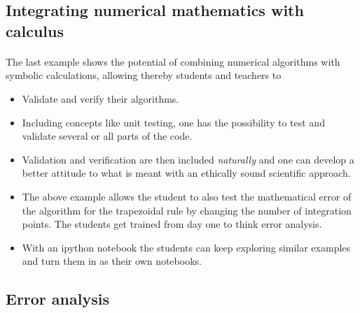 \documentclass[%
twoside,                 %
final,                   %
10pt]{article}
\begin{document}
\subsection{Integrating numerical mathematics with calculus}

\paragraph{}
The last example shows the potential of combining numerical algorithms with symbolic calculations, allowing thereby students and teachers to

\begin{itemize}
\item Validate and verify  their  algorithms. 

\item Including concepts like unit testing, one has the possibility to test and validate several or all parts of the code.

\item Validation and verification are then included \emph{naturally} and one can develop a better attitude to what is meant with an ethically sound scientific approach.

\item The above example allows the student to also test the mathematical error of the algorithm for the trapezoidal rule by changing the number of integration points. The students get trained from day one to think error analysis. 

\item With an ipython notebook the students can keep exploring similar examples and turn them in as their own notebooks. 
\end{itemize}

\noindent



\subsection{Error analysis}

\end{document}
